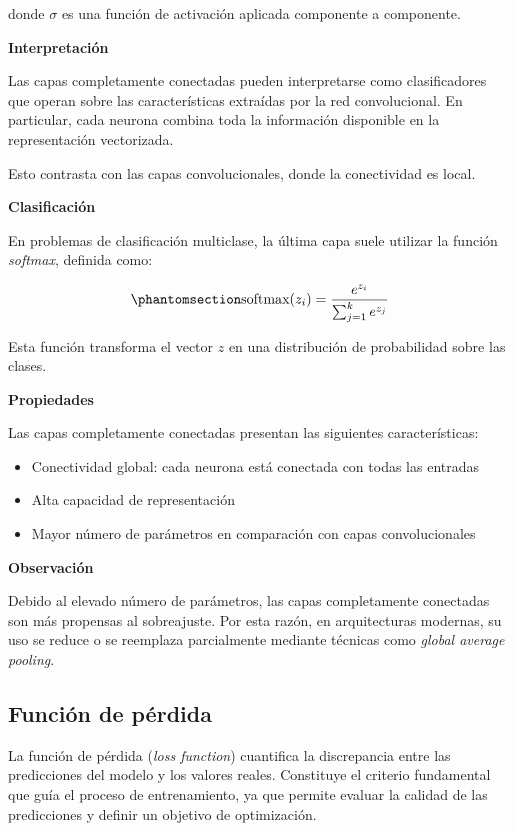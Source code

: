 \documentclass[
  spanish,
  us-letterpaper,
  DIV=11,
  numbers=noendperiod]{scrreprt}
\providecommand{\tightlist}{%
  \setlength{\itemsep}{0pt}\setlength{\parskip}{0pt}}
\begin{document}
donde \(\sigma\) es una función de activación aplicada componente a
componente.

\textbf{Interpretación}

Las capas completamente conectadas pueden interpretarse como
clasificadores que operan sobre las características extraídas por la red
convolucional. En particular, cada neurona combina toda la información
disponible en la representación vectorizada.

Esto contrasta con las capas convolucionales, donde la conectividad es
local.

\textbf{Clasificación}

En problemas de clasificación multiclase, la última capa suele utilizar
la función \emph{softmax}, definida como:

\begin{equation}\phantomsection\label{eq-softmax}{
\text{softmax}(z_i) =
\frac{e^{z_i}}{\sum_{j=1}^{k} e^{z_j}}
}\end{equation}

Esta función transforma el vector \(z\) en una distribución de
probabilidad sobre las clases.

\textbf{Propiedades}

Las capas completamente conectadas presentan las siguientes
características:

\begin{itemize}
\tightlist
\item
  Conectividad global: cada neurona está conectada con todas las
  entradas\\
\item
  Alta capacidad de representación\\
\item
  Mayor número de parámetros en comparación con capas convolucionales
\end{itemize}

\textbf{Observación}

Debido al elevado número de parámetros, las capas completamente
conectadas son más propensas al sobreajuste. Por esta razón, en
arquitecturas modernas, su uso se reduce o se reemplaza parcialmente
mediante técnicas como \emph{global average pooling}.

\subsection{Función de pérdida}\label{funciuxf3n-de-puxe9rdida}

La función de pérdida (\emph{loss function}) cuantifica la discrepancia
entre las predicciones del modelo y los valores reales. Constituye el
criterio fundamental que guía el proceso de entrenamiento, ya que
permite evaluar la calidad de las predicciones y definir un objetivo de
optimización.
\end{document}
